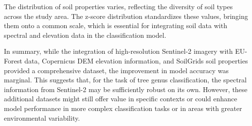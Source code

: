 The distribution of soil properties varies, reflecting the diversity of soil types across the study area. The z-score distribution standardizes these values, bringing them onto a common scale, which is essential for integrating soil data with spectral and elevation data in the classification model.

In summary, while the integration of high-resolution Sentinel-2 imagery with EU-Forest data, Copernicus DEM elevation information, and SoilGrids soil properties provided a comprehensive dataset, the improvement in model accuracy was marginal. This suggests that, for the task of tree genus classification, the spectral information from Sentinel-2 may be sufficiently robust on its own. However, these additional datasets might still offer value in specific contexts or could enhance model performance in more complex classification tasks or in areas with greater environmental variability.